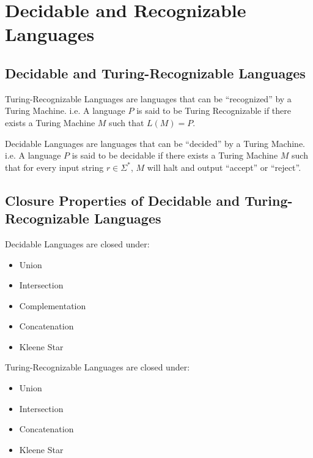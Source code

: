 \chapter{Decidable and Recognizable Languages}
    \section{Decidable and Turing-Recognizable Languages}
        Turing-Recognizable Languages are languages that can be ``recognized''
        by a Turing Machine. i.e. A language $P$ is said to be Turing
        Recognizable if there exists a Turing Machine $M$ such that $L(M) = P$.

        Decidable Languages are languages that can be ``decided'' by a Turing
        Machine. i.e. A language $P$ is said to be decidable if there exists a
        Turing Machine $M$ such that for every input string $r \in \Sigma^*$,
        $M$ will halt and output ``accept'' or ``reject''.

    \section{Closure Properties of Decidable and Turing-Recognizable Languages}
        Decidable Languages are closed under:
        \begin{itemize}
            \item Union
            \item Intersection
            \item Complementation
            \item Concatenation
            \item Kleene Star
        \end{itemize}

        Turing-Recognizable Languages are closed under:
        \begin{itemize}
            \item Union
            \item Intersection
            \item Concatenation
            \item Kleene Star
        \end{itemize}
